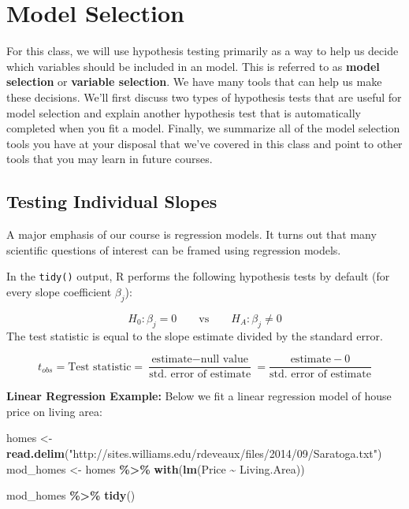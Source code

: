 \documentclass[
]{book}
\newenvironment{Shaded}{\begin{snugshade}}{\end{snugshade}}
\newcommand{\FunctionTok}[1]{\textcolor[rgb]{0.13,0.29,0.53}{\textbf{#1}}}
\newcommand{\NormalTok}[1]{#1}
\newcommand{\OtherTok}[1]{\textcolor[rgb]{0.56,0.35,0.01}{#1}}
\newcommand{\SpecialCharTok}[1]{\textcolor[rgb]{0.81,0.36,0.00}{\textbf{#1}}}
\newcommand{\StringTok}[1]{\textcolor[rgb]{0.31,0.60,0.02}{#1}}
\begin{document}
\section{Model Selection}\label{model-selection}

For this class, we will use hypothesis testing primarily as a way to help us decide which variables should be included in an model. This is referred to as \textbf{model selection} or \textbf{variable selection}. We have many tools that can help us make these decisions. We'll first discuss two types of hypothesis tests that are useful for model selection and explain another hypothesis test that is automatically completed when you fit a model. Finally, we summarize all of the model selection tools you have at your disposal that we've covered in this class and point to other tools that you may learn in future courses.

\subsection{Testing Individual Slopes}\label{testing-individual-slopes}

A major emphasis of our course is regression models. It turns out that many scientific questions of interest can be framed using regression models.

In the \texttt{tidy()} output, R performs the following hypothesis tests by default (for every slope coefficient \(\beta_j\)):

\[H_0: \beta_j = 0 \qquad \text{vs} \qquad H_A: \beta_j \neq 0\]
The test statistic is equal to the slope estimate divided by the standard error.

\[t_{obs} = \text{Test statistic} = \frac{\text{estimate} - \text{null value}}{\text{std. error of estimate}} = \frac{\text{estimate} - 0}{\text{std. error of estimate}} \]

\textbf{Linear Regression Example:} Below we fit a linear regression model of house price on living area:

\begin{Shaded}
\begin{Highlighting}[]
\NormalTok{homes }\OtherTok{\textless{}{-}} \FunctionTok{read.delim}\NormalTok{(}\StringTok{"http://sites.williams.edu/rdeveaux/files/2014/09/Saratoga.txt"}\NormalTok{)}
\NormalTok{mod\_homes }\OtherTok{\textless{}{-}}\NormalTok{ homes }\SpecialCharTok{\%\textgreater{}\%}
  \FunctionTok{with}\NormalTok{(}\FunctionTok{lm}\NormalTok{(Price }\SpecialCharTok{\textasciitilde{}}\NormalTok{ Living.Area))}

\NormalTok{mod\_homes }\SpecialCharTok{\%\textgreater{}\%} \FunctionTok{tidy}\NormalTok{()}
\end{Highlighting}
\end{Shaded}
\end{document}
